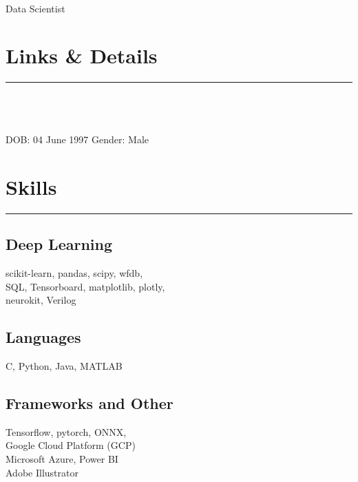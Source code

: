 \documentclass[]{rahulworld-resume}
\begin{document}
%
%

\begin{minipage}[t]{0.33\textwidth} 
\begin{large}
	\\
\end{large}
Data Scientist\\

\section{Links \& Details} 
\noindent\rule{5cm}{0.4pt}

\href{https://github.com/anoushkrit}{} \\
\href{https://www.linkedin.com/in/anoushkrit}{} \\
\href{https://sites.google.com/view/anoushkritgoel}{} \\

DOB: 04 June 1997
Gender: Male
\section{Skills}
\noindent\rule{5cm}{0.4pt}
\subsection{Deep Learning}
scikit-learn, pandas, scipy, wfdb,\\
SQL, Tensorboard, matplotlib, plotly, \\
neurokit, Verilog
\vspace{6pt}
\subsection{Languages}
C, Python, Java, MATLAB
\vspace{6pt}
\subsection{Frameworks and Other}
Tensorflow, pytorch, ONNX,\\
Google Cloud Platform (GCP)\\
Microsoft Azure, Power BI \\
Adobe Illustrator\\


\end{minipage}
\end{document}
